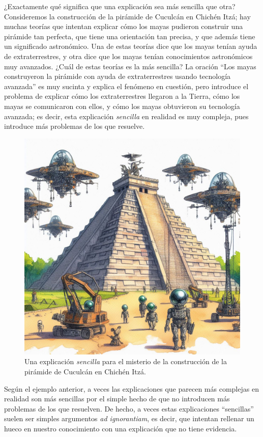 ¿Exactamente qué significa que una explicación sea más sencilla que otra?
Consideremos la construcción de la pirámide de Cuculcán en Chichén Itzá; hay
muchas teorías que intentan explicar cómo los mayas pudieron construir una
pirámide tan perfecta, que tiene una orientación tan precisa, y que además
tiene un significado astronómico.
Una de estas teorías dice que los mayas tenían ayuda de extraterrestres, y otra
dice que los mayas tenían conocimientos astronómicos muy avanzados.
¿Cuál de estas teorías es la más sencilla?
La oración “Los mayas construyeron la pirámide con ayuda de extraterrestres
usando tecnología avanzada” es muy sucinta y explica el fenómeno en cuestión,
pero introduce el problema de explicar cómo los extraterrestres llegaron a la
Tierra, cómo los mayas se comunicaron con ellos, y cómo los mayas obtuvieron
su tecnología avanzada; es decir, esta explicación \emph{sencilla} en realidad
es muy compleja, pues introduce más problemas de los que resuelve.

\begin{figure}[ht]
    \centering
    \includegraphics[width=0.8\linewidth]{img/chichenitza}
    \caption{Una explicación \emph{sencilla} para el misterio de la construcción
        de la pirámide de Cuculcán en Chichén Itzá.}
\end{figure}

Según el ejemplo anterior, a veces las explicaciones que parecen más complejas
en realidad son más sencillas por el simple hecho de que no introducen más
problemas de los que resuelven.
De hecho, a veces estas explicaciones “sencillas” suelen ser simples argumentos
\emph{ad ignorantiam}, es decir, que intentan rellenar un hueco en nuestro
conocimiento con una explicación que no tiene evidencia.

